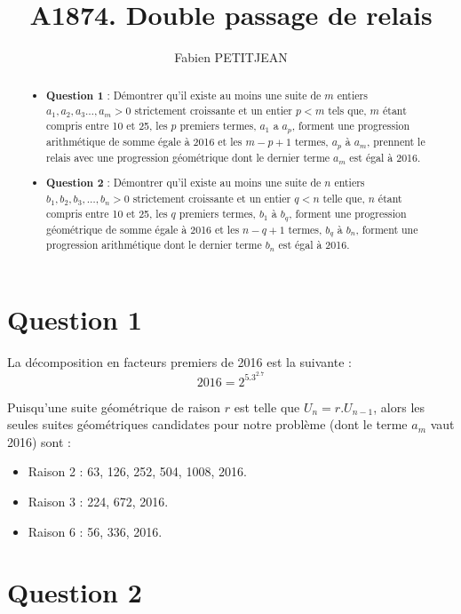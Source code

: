 \documentclass[10pt,a4paper,onecolumn]{article}
\author{Fabien PETITJEAN}
\title{A1874. Double passage de relais}
\begin{document}
\maketitle
\begin{abstract}
\noindent\begin{itemize}
\item {\bf Question 1} : 
Démontrer qu'il existe au moins une suite de $m$ entiers $a_1,a_2,a_3 \ldots,a_m > 0$ strictement croissante et un entier $p < m$ tels que, $m$ étant compris entre 10 et 25, les $p$ premiers termes, $a_1$ a $a_p$, forment une progression arithmétique de somme égale à 2016 et les $m-p+1$ termes, $a_p$ à $a_m$, prennent le relais avec une progression géométrique dont le dernier terme $a_m$ est égal à 2016.

\item {\bf Question 2} : 
Démontrer qu'il existe au moins une suite de $n$ entiers $b_1,b_2,b_3,\ldots,b_n > 0$ strictement croissante et un entier $q < n$ telle que, $n$ étant compris entre 10 et 25, les $q$ premiers termes, $b_1$ à $b_q$, forment une progression géométrique de somme égale à 2016 et les $n-q+1$ termes, $b_q$ à $b_n$, forment une progression arithmétique dont le dernier terme $b_n$ est égal à 2016.
\end{itemize}
\end{abstract}


\section{Question 1}
La décomposition en facteurs premiers de 2016 est la suivante : 
$$2016=2^5.3^2.7$$

Puisqu'une suite géométrique de raison $r$ est telle que $U_n = r.U_{n-1}$, alors les seules suites géométriques candidates pour notre problème (dont le terme $a_m$ vaut 2016) sont :
\begin{itemize}
\item Raison 2 : 63, 126, 252, 504, 1008, 2016.
\item Raison 3 : 224, 672, 2016.
\item Raison 6 : 56, 336, 2016.
\end{itemize}
\section{Question 2}
\end{document}
